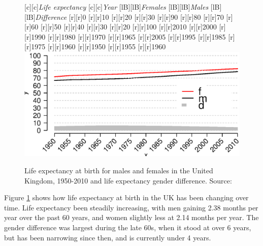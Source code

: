 \documentclass[11 pt, a4paper]{report}
\begin{document}
\begin{figure}[hbtp!]
[c][c]{\small{\emph{Life expectancy}}}
[c][c]{\small{\emph{Year}}}
[lB][lB]{\small{\emph{Females}}}
[lB][lB]{\small{\emph{Males}}}
[lB][lB]{\small{\emph{Difference}}}
[r][r]{\small{0}}
[r][r]{\small{10}}
[r][r]{\small{20}}
[r][r]{\small{30}}
[r][r]{\small{90}}
[r][r]{\small{80}}
[r][r]{\small{70}}
[r][r]{\small{60}}
[r][r]{\small{50}}
[r][r]{\small{40}}
[r][r]{\small{30}}
[r][r]{\small{20}}
[r][r]{\small{100}}
[r][r]{\small{2010}}
[r][r]{\small{2000}}
[r][r]{\small{1990}}
[r][r]{\small{1980}}
[r][r]{\small{1970}}
[r][r]{\small{1965}}
[r][r]{\small{2005}}
[r][r]{\small{1995}}
[r][r]{\small{1985}}
[r][r]{\small{1975}}
[r][r]{\small{1960}}
[r][r]{\small{1950}}
[r][r]{\small{1955}}
[r][r]{\small{1960}}
\includegraphics[width=\textwidth]{../figures/Fig2.1.eps}
\caption{Life expectancy at birth for males and females in the United Kingdom, 1950-2010 and life expectancy gender difference. Source: \cite{HMD2015}}
\label{Fig:07}
\end{figure}

Figure \ref{Fig:07} shows how life expectancy at birth in the UK has been changing over time. Life expectancy been steadily increasing, with men gaining 2.38 months per year over the past 60 years, and women slightly less at 2.14 months per year. The gender difference was largest during the late 60s, when it stood at over 6 years, but has been narrowing since then, and is currently under 4 years.
\end{document}
